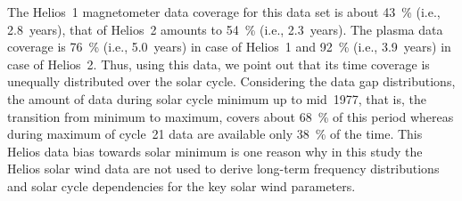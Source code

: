 The Helios~1 magnetometer data coverage for this data set is about \SI{43}{\%} (i.e., 2.8~years), that of Helios~2 amounts to \SI{54}{\%} (i.e., 2.3~years). The plasma data coverage is \SI{76}{\%} (i.e., 5.0~years) in case of Helios~1 and \SI{92}{\%} (i.e., 3.9~years) in case of Helios~2. 
Thus, using this data, we point out that its time coverage is unequally distributed over the solar cycle. Considering the data gap distributions, the amount of data during solar cycle minimum up to mid~1977, that is, the transition from minimum to maximum, covers about \SI{68}{\percent} of this period whereas during maximum of cycle~21 data are available only \SI{38}{\percent} of the time. This Helios data bias towards solar minimum is one reason why in this study the Helios solar wind data are not used to derive long-term frequency distributions and solar cycle dependencies for the key solar wind parameters.
% 


